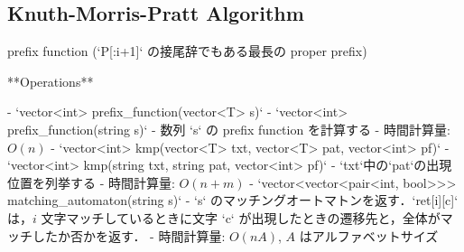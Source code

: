 \subsection{Knuth-Morris-Pratt Algorithm}

\begin{small}
\begin{markdown}
prefix function (`P[:i+1]` の接尾辞でもある最長の proper prefix)

**Operations**

- `vector<int> prefix\_function(vector<T> s)`
- `vector<int> prefix\_function(string s)`
    - 数列 `s` の prefix function を計算する
    - 時間計算量: $O(n)$
- `vector<int> kmp(vector<T> txt, vector<T> pat, vector<int> pf)`
- `vector<int> kmp(string txt, string pat, vector<int> pf)`
    - `txt`中の`pat`の出現位置を列挙する
    - 時間計算量: $O(n + m)$
- `vector<vector<pair<int, bool>>> matching\_automaton(string s)`
    - `s` のマッチングオートマトンを返す．`ret[i][c]` は，$i$ 文字マッチしているときに文字 `c` が出現したときの遷移先と，全体がマッチしたか否かを返す．
    - 時間計算量: $O(nA)$, $A$ はアルファベットサイズ

\end{markdown}
\end{small}

